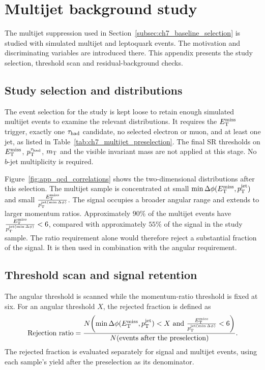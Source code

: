 \chapter{Multijet background study}
\label{App:QCD_bkg_study}

The multijet suppression used in Section~\ref{subsec:ch7_baseline_selection} is studied with simulated multijet and leptoquark events.
The motivation and discriminating variables are introduced there. This appendix presents the study selection, threshold scan and residual-background checks.

\section{Study selection and distributions}
\label{sec:app_qcd_selection}

The event selection for the study is kept loose to retain enough simulated multijet events to examine the relevant distributions.
It requires the $E_{\mathrm{T}}^{\mathrm{miss}}$ trigger, exactly one $\tau_{\mathrm{had}}$ candidate, no selected electron or muon, and at least one jet, as listed in Table~\ref{tab:ch7_multijet_preselection}.
The final SR thresholds on $E_{\mathrm{T}}^{\mathrm{miss}}$, $p_{\mathrm{T}}^{\tau_{\mathrm{had}}}$, $m_{\mathrm{T}}$ and the visible invariant mass are not applied at this stage.
No $b$-jet multiplicity is required.

Figure~\ref{fig:app_qcd_correlations} shows the two-dimensional distributions after this selection.
The multijet sample is concentrated at small $\min\Delta\phi(E_{\mathrm{T}}^{\mathrm{miss}},p_{\mathrm{T}}^{\mathrm{jet}})$ and small $\frac{E_{\mathrm{T}}^{\mathrm{miss}}}{p_{\mathrm{T}}^{\mathrm{jet}(\min{\Delta\phi)}}}$.
The signal occupies a broader angular range and extends to larger momentum ratios.
Approximately $90\%$ of the multijet events have $\frac{E_{\mathrm{T}}^{\mathrm{miss}}}{p_{\mathrm{T}}^{\mathrm{jet}(\min{\Delta\phi)}}}<6$, compared with approximately $55\%$ of the signal in the study sample.
The ratio requirement alone would therefore reject a substantial fraction of the signal.
It is then used in combination with the angular requirement.

\section{Threshold scan and signal retention}
\label{sec:app_qcd_scan}

The angular threshold is scanned while the momentum-ratio threshold is fixed at six.
For an angular threshold $X$, the rejected fraction is defined as
\begin{equation*}
    \text{Rejection ratio}=\frac{N\!\left(\minDphiJetMet<X\ \text{and}\ \metOverMinDphiJetPt<6\right)}{N(\text{events after the preselection})}.
\end{equation*}
The rejected fraction is evaluated separately for signal and multijet events, using each sample's yield after the preselection as its denominator.

